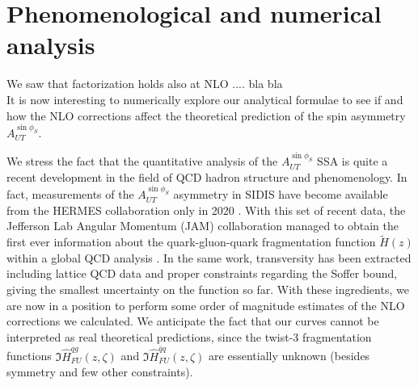 
\chapter{Phenomenological and numerical analysis}
We saw that factorization holds also at NLO .... bla bla\\
It is now interesting to numerically explore our analytical formulae to see if and how the NLO corrections affect the theoretical prediction of the spin asymmetry $A_{UT}^{\sin\phi_S}$. 

We stress the fact that the quantitative analysis of the $A_{UT}^{\sin\phi_S}$ SSA is quite a recent development in the field of QCD hadron structure and phenomenology. In fact, measurements of the $A_{UT}^{\sin\phi_S}$ asymmetry in SIDIS have become available from the HERMES collaboration only in 2020 \cite{hermescollaboration2020azimuthalsingledoublespinasymmetries}. With this set of recent data, the Jefferson Lab Angular Momentum (JAM) collaboration managed to obtain the first ever information about the quark-gluon-quark fragmentation function $\tilde{H}(z) $ within a global QCD analysis \cite{Gamberg2022Htilde}. In the same work, transversity has been extracted including lattice QCD data and proper constraints regarding the Soffer bound, giving the smallest uncertainty on the function so far. With these ingredients, we are now in a position to perform some order of magnitude estimates of the NLO corrections we calculated. We anticipate the fact that our curves cannot be interpreted as real theoretical predictions, since the twist-3 fragmentation functions $\Im\hat{H}_{FU}^{qg}(z,\zeta)$ and $\Im\hat{H}_{FU}^{\bar{q}q}(z,\zeta)$ are essentially unknown (besides symmetry and few other constraints).

